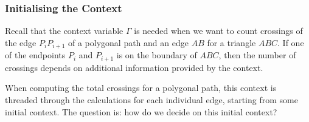 



\subsubsection{Initialising the Context}\label{sec:ContextInitialisation}
Recall that the context variable $\Gamma$ is needed when we want to count crossings of the edge $P_iP_{i+1}$ of a polygonal path and an edge $AB$ for a triangle $ABC$. If one of the endpoints $P_i$ and $P_{i+1}$ is on the boundary of $ABC$, then the number of crossings depends on additional information provided by the context. 

When computing the total crossings for a polygonal path, this context is threaded through the calculations for each individual edge, starting from some initial context. The question is: how do we decide on this initial context?

